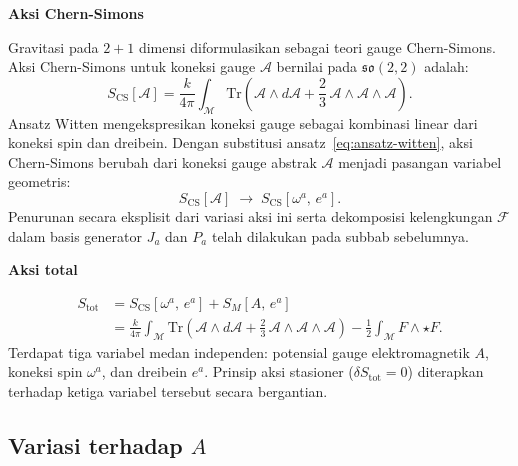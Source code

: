\vspace{0.5em}
\noindent \textbf{Aksi Chern-Simons}

Gravitasi pada $2+1$ dimensi diformulasikan sebagai teori gauge Chern-Simons. Aksi Chern-Simons untuk koneksi gauge $\mathcal{A}$ bernilai pada $\mathfrak{so}(2,2)$ adalah:
\begin{equation}\label{em43-eq:aksi-CS}
    S_{\mathrm{CS}}[\mathcal{A}]
    = \frac{k}{4\pi} \int_{\mathcal{M}}
    \mathrm{Tr}\!\left(\mathcal{A} \wedge d\mathcal{A}
    + \frac{2}{3}\, \mathcal{A} \wedge \mathcal{A}
    \wedge \mathcal{A}\right).
\end{equation}
Ansatz Witten mengekspresikan koneksi gauge sebagai kombinasi linear dari koneksi spin dan dreibein. Dengan substitusi ansatz~\eqref{eq:ansatz-witten}, aksi Chern-Simons berubah dari koneksi gauge abstrak $\mathcal{A}$ menjadi pasangan variabel geometris:
\begin{equation}\label{em43-eq:CS-geometris}
    S_{\mathrm{CS}}[\mathcal{A}]
    \;\longrightarrow\;
    S_{\mathrm{CS}}[\omega^{a},\, e^{a}].
\end{equation}
Penurunan secara eksplisit dari variasi aksi ini serta dekomposisi kelengkungan $\mathcal{F}$ dalam basis generator $J_{a}$ dan $P_{a}$ telah dilakukan pada subbab sebelumnya.

\vspace{0.5em}
\noindent \textbf{Aksi total}

\begin{align}
    S_{\mathrm{tot}}
    &= S_{\mathrm{CS}}[\omega^{a},\, e^{a}]
    + S_{M}[A,\, e^{a}] \nonumber\\
    &= \frac{k}{4\pi} \int_{\mathcal{M}}
    \mathrm{Tr}\!\left(\mathcal{A} \wedge d\mathcal{A}
    + \frac{2}{3}\, \mathcal{A} \wedge \mathcal{A}
    \wedge \mathcal{A}\right) -\frac{1}{2} \int_{\mathcal{M}} F \wedge \star F. \label{em43-eq:aksi-total}
\end{align}
Terdapat tiga variabel medan independen: potensial gauge elektromagnetik $A$, koneksi spin $\omega^{a}$, dan dreibein $e^{a}$. Prinsip aksi stasioner ($\delta S_{\mathrm{tot}} = 0$) diterapkan terhadap ketiga variabel tersebut secara bergantian.

\subsection{Variasi terhadap $A$}

